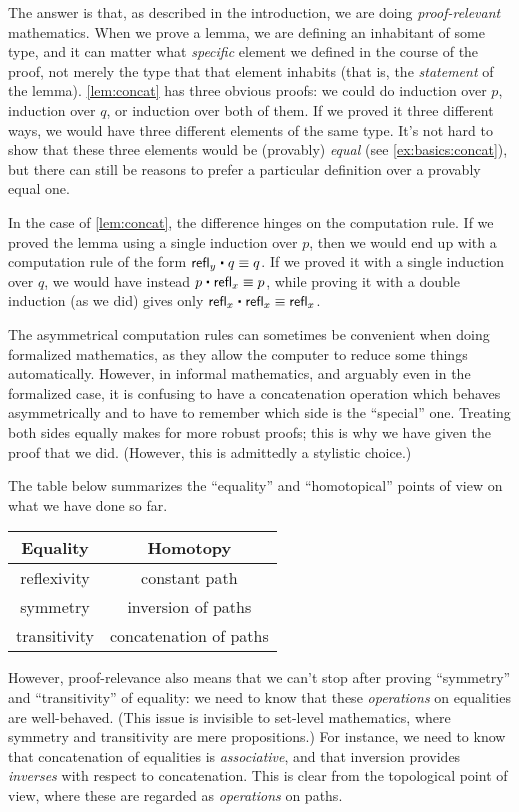 The answer is that, as described in the introduction, we are doing \emph{proof-relevant} mathematics.
When we prove a lemma, we are defining an inhabitant of some type, and it can matter what \emph{specific} element we defined in the course of the proof, not merely the type that that element inhabits (that is, the \emph{statement} of the lemma).
\autoref{lem:concat} has three obvious proofs: we could do induction over $p$, induction over $q$, or induction over both of them.
If we proved it three different ways, we would have three different elements of the same type.
It's not hard to show that these three elements would be (provably) \emph{equal} (see \autoref{ex:basics:concat}), but there can still be reasons to prefer a particular definition over a provably equal one.

In the case of \autoref{lem:concat}, the difference hinges on the computation rule.
If we proved the lemma using a single induction over $p$, then we would end up with a computation rule of the form $\refl{y} \ct q \jdeq q$.
If we proved it with a single induction over $q$, we would have instead $p\ct\refl{x}\jdeq p$, while proving it with a double induction (as we did) gives only $\refl{x}\ct\refl{x} \jdeq \refl{x}$.

The asymmetrical computation rules can sometimes be convenient when doing formalized mathematics, as they allow the computer to reduce some things automatically.
However, in informal mathematics, and arguably even in the formalized case, it is confusing to have a concatenation operation which behaves asymmetrically and to have to remember which side is the ``special'' one.
Treating both sides equally makes for more robust proofs; this is why we have given the proof that we did.
(However, this is admittedly a stylistic choice.)

The table below summarizes the ``equality'' and ``homotopical'' points of view on what we have done so far.
\begin{center}
  \begin{tabular}{c|c}
    Equality & Homotopy \\\hline
    reflexivity & constant path\\
    symmetry & inversion of paths\\
    transitivity & concatenation of paths
  \end{tabular}
\end{center}

However, proof-relevance also means that we can't stop after proving ``symmetry'' and  ``transitivity'' of equality: we need to know that these \emph{operations} on equalities are well-behaved.
(This issue is invisible to set-level mathematics, where symmetry and transitivity are mere propositions.)
For instance, we need to know that concatenation of equalities is \emph{associative}, and that inversion provides \emph{inverses} with respect to concatenation.
This is clear from the topological point of view, where these are regarded as \emph{operations} on paths.

